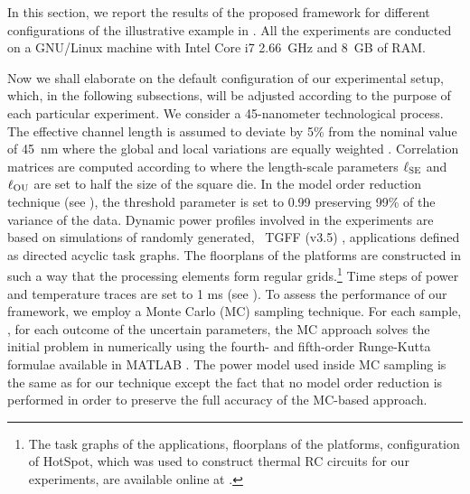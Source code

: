 
In this section, we report the results of the proposed framework for different configurations of the illustrative example in .
All the experiments are conducted on a GNU/Linux machine with Intel Core i7 2.66~GHz and 8~GB of RAM.

Now we shall elaborate on the default configuration of our experimental setup, which, in the following subsections, will be adjusted according to the purpose of each particular experiment.
We consider a 45-nanometer technological process.
The effective channel length is assumed to deviate by 5\% from the nominal value of 45~nm where the global and local variations are equally weighted \cite{juan2011, juan2012}.
Correlation matrices are computed according to  where the length-scale parameters $\ell_{\text{SE}}$ and $\ell_{\text{OU}}$ are set to half the size of the square die.
In the model order reduction technique (see ), the threshold parameter is set to 0.99 preserving 99\% of the variance of the data.
Dynamic power profiles involved in the experiments are based on simulations of randomly generated, \via\ TGFF (v3.5) \cite{dick1998}, applications defined as directed acyclic task graphs.
The floorplans of the platforms are constructed in such a way that the processing elements form regular grids.\footnote{The task graphs of the applications, floorplans of the platforms, configuration of HotSpot, which was used to construct thermal RC circuits for our experiments, are available online at \cite{sources}.}
Time steps of power and temperature traces are set to 1 ms (see ).
To assess the performance of our framework, we employ a Monte Carlo (MC) sampling technique.
For each sample, \ie, for each outcome of the uncertain parameters, the MC approach solves the initial problem in  numerically using the fourth- and fifth-order Runge-Kutta formulae \cite{press2007} available in MATLAB \cite{matlab}.
The power model used inside MC sampling is the same as for our technique except the fact that no model order reduction is performed in order to preserve the full accuracy of the MC-based approach.

